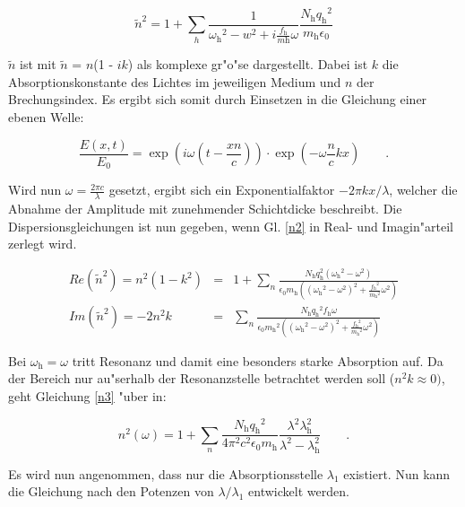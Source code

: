	\begin{equation}
		\tilde{n}^2 = 1 + \sum_h \frac{1}{{\omega_\mathrm{h}}^2 - w^2 + i \frac{f_\mathrm{h}}{m\mathrm{h}} \omega} \frac{N_\mathrm{h} {q_\mathrm{h}}^2}{m_\mathrm{h} \epsilon_\mathrm{0}}  \label{n2}
	\end{equation}

	$\tilde{n}$ ist mit $\tilde{n}$ = $n$(1 - $ik$) als komplexe gr"o"se dargestellt. Dabei ist $k$ die Absorptionskonstante des Lichtes im jeweiligen Medium und $n$ der Brechungsindex.
	Es ergibt sich somit durch Einsetzen in die Gleichung einer ebenen Welle:

	\begin{equation}
		\frac{E(x,t)}{E_\mathrm{0}} = \exp{(i\omega(t- \frac{xn}{c}))} \cdot \exp{(-\omega \frac{n}{c} kx)} \qquad .
	\end{equation}
 
	Wird nun $\omega = \frac{2\pi c}{\lambda}$ gesetzt, ergibt sich ein Exponentialfaktor $-2\pi kx/\lambda$, welcher die Abnahme der Amplitude mit zunehmender Schichtdicke beschreibt. Die Dispersionsgleichungen ist nun gegeben, wenn Gl. \eqref{n2} in Real- und Imagin"arteil zerlegt wird. 

	\begin{eqnarray}
		Re(\tilde{n}^2) = n^2(1-k^2) &=& 1 + \sum_n \frac{N_\mathrm{h} {q_\mathrm{h}^2 ({\omega_\mathrm{h}}^2 -\omega^2)}}{\epsilon_\mathrm{0} m_\mathrm{h} \left( ( {\omega_\mathrm{h}}^2-\omega^2)^2 + \frac{{f_\mathrm{h}}^2}{{m_\mathrm{h}}^2} \omega^2 \right)}  \label{n3}\\
		Im(\tilde{n}^2) = -2n^2k &=& \sum_n \frac{N_\mathrm{h} {q_\mathrm{h}}^2 f_\mathrm{h} \omega}{\epsilon_\mathrm{0} {m_\mathrm{h}}^2 \left( ( {\omega_\mathrm{h}}^2-\omega^2)^2 + \frac{{f_\mathrm{h}}^2}{{m_\mathrm{h}}^2} \omega^2 \right)}  \nonumber
	\end{eqnarray}

	Bei $\omega_\mathrm{h} = \omega$ tritt Resonanz und damit eine besonders starke Absorption auf. Da der Bereich nur au"serhalb der Resonanzstelle betrachtet werden soll ($n^2k \approx 0)$, geht Gleichung \eqref{n3} "uber in:

	\begin{equation}
		n^2(\omega) = 1 + \sum_n \frac{N_\mathrm{h} {q_\mathrm{h}}^2}{4 \pi^2 c^2 \epsilon_\mathrm{0} m_\mathrm{h}} \frac{\lambda^2 \lambda_\mathrm{h}^2}{\lambda^2 - \lambda_\mathrm{h}^2} \qquad . 
	\end{equation}

	Es wird nun angenommen, dass nur die Absorptionsstelle $\lambda_\mathrm{1}$ existiert. Nun kann die Gleichung nach den Potenzen von $\lambda/\lambda_\mathrm{1}$ entwickelt werden.


